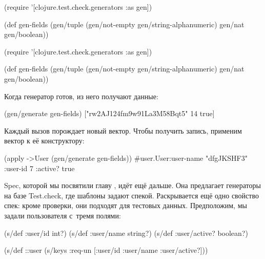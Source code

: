 \ifnarrow

\begin{english}
  \begin{clojure}
(require
 '[clojure.test.check.generators
   :as gen])

(def gen-fields
  (gen/tuple
    (gen/not-empty
      gen/string-alphanumeric)
    gen/nat
    gen/boolean))
  \end{clojure}
\end{english}

\else

\begin{english}
  \begin{clojure}
(require '[clojure.test.check.generators :as gen])

(def gen-fields
  (gen/tuple (gen/not-empty gen/string-alphanumeric)
             gen/nat
             gen/boolean))
  \end{clojure}
\end{english}

\fi

Когда генератор готов, из него получают данные:

\begin{english}
  \begin{clojure}
(gen/generate gen-fields)
["rw2AJ124fm9w91La3M58Bqt5" 14 true]
  \end{clojure}
\end{english}

\noindent
Каждый вызов порождает новый вектор. Чтобы получить запись, применим вектор к её
конструктору:

\begin{english}
  \begin{clojure}
(apply ->User (gen/generate gen-fields))
#user.User{:user-name "dfgJKSHF3"
           :user-id 7
           :active? true}
  \end{clojure}
\end{english}

Spec, которой мы посвятили главу , идёт ещё дальше. Она
предлагает генераторы на базе Test.check, где шаблоны задают
спекой. Раскрывается ещё одно свойство спек: кроме проверки, они подходят для
тестовых данных. Предположим, мы задали пользователя с~тремя полями:

\ifnarrow

\begin{english}
  \begin{clojure}
(s/def :user/id int?)
(s/def :user/name string?)
(s/def :user/active? boolean?)

(s/def ::user
  (s/keys :req-un [:user/id
                   :user/name
                   :user/active?]))
  \end{clojure}
\end{english}

